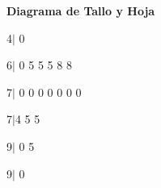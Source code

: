 \documentclass{../oxmathproblems}
\begin{document}
\begin{questions}
\miquestion \textbf { Diagrama de Tallo y Hoja} 

4$\mid$ 0 

6$\mid$ 0 5 5 5 8 8 

7$\mid$ 0 0 0 0 0 0 0 

7$\mid$4  5 5 

9$\mid$ 0 5 

 9$\mid$ 0 

\end{questions}
\end{document}

